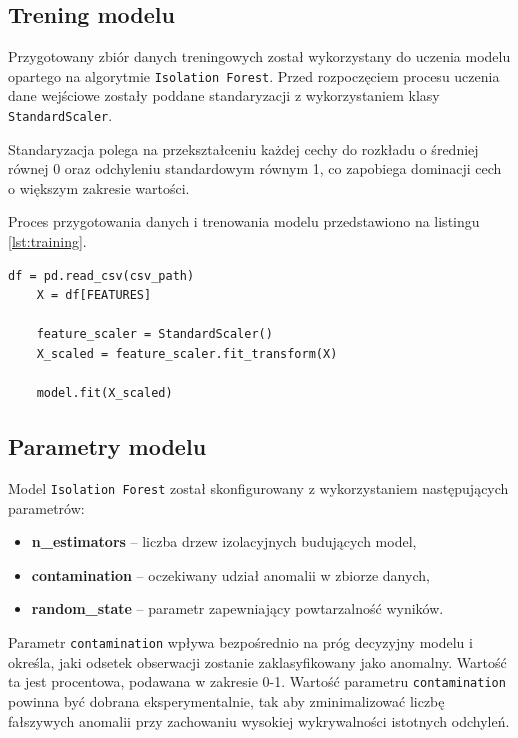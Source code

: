 \subsection{Trening modelu}

Przygotowany zbiór danych treningowych został wykorzystany do uczenia modelu opartego na algorytmie \texttt{Isolation Forest}. Przed rozpoczęciem procesu uczenia dane wejściowe zostały poddane standaryzacji z wykorzystaniem klasy \texttt{StandardScaler}. 

Standaryzacja polega na przekształceniu każdej cechy do rozkładu o średniej równej 0 oraz odchyleniu standardowym równym 1, co zapobiega dominacji cech o większym zakresie wartości.

Proces przygotowania danych i trenowania modelu przedstawiono na listingu \ref{lst:training}.

\newpage

\begin{lstlisting}[style=pythonstyle, caption={Skalowanie danych i trening modelu}, label={lst:training}]
	df = pd.read_csv(csv_path)
	X = df[FEATURES]
	
	feature_scaler = StandardScaler()
	X_scaled = feature_scaler.fit_transform(X)
	
	model.fit(X_scaled)
\end{lstlisting}

\subsection{Parametry modelu}
\label{subsec:model-parameters}

Model \texttt{Isolation Forest} został skonfigurowany z wykorzystaniem następujących parametrów:

\begin{itemize}
	\item \textbf{n\_estimators} – liczba drzew izolacyjnych budujących model,
	\item \textbf{contamination} – oczekiwany udział anomalii w zbiorze danych,
	\item \textbf{random\_state} – parametr zapewniający powtarzalność wyników.
\end{itemize}

Parametr \texttt{contamination} wpływa bezpośrednio na próg decyzyjny modelu i określa, jaki odsetek obserwacji zostanie zaklasyfikowany jako anomalny. Wartość ta jest procentowa, podawana w zakresie 0-1. Wartość parametru \texttt{contamination} powinna być dobrana eksperymentalnie, tak aby zminimalizować liczbę fałszywych anomalii przy zachowaniu wysokiej wykrywalności istotnych odchyleń.

